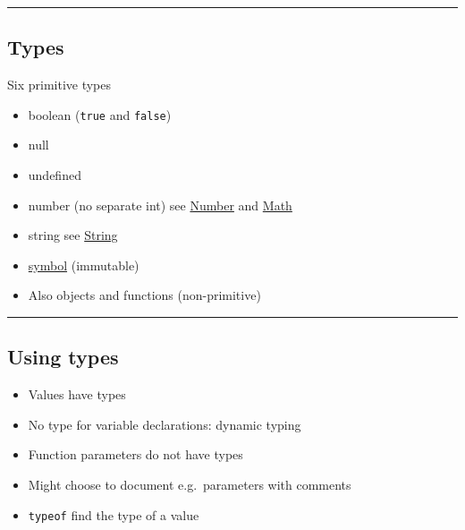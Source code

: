 \documentclass{article}[18pt]
\providecommand{\tightlist}{%
  \setlength{\itemsep}{0pt}\setlength{\parskip}{0pt}}
\begin{document}
\begin{center}\rule{0.5\linewidth}{\linethickness}\end{center}

\hypertarget{types}{%
\subsection{Types}\label{types}}

Six primitive types

\begin{itemize}
\tightlist
\item
  boolean (\texttt{true} and \texttt{false})
\item
  null
\item
  undefined
\item
  number (no separate int) see
  \href{https://developer.mozilla.org/en-US/docs/Web/JavaScript/Reference/Global_Objects/Number}{Number}
  and
  \href{https://developer.mozilla.org/en-US/docs/Web/JavaScript/Reference/Global_Objects/Math}{Math}
\item
  string see
  \href{https://developer.mozilla.org/en-US/docs/Web/JavaScript/Reference/Global_Objects/String}{String}
\item
  \href{https://developer.mozilla.org/en-US/docs/Glossary/Symbol}{symbol}
  (immutable)
\item
  Also objects and functions (non-primitive)
\end{itemize}

\begin{center}\rule{0.5\linewidth}{\linethickness}\end{center}

\hypertarget{using-types}{%
\subsection{Using types}\label{using-types}}

\begin{itemize}
\tightlist
\item
  Values have types
\item
  No type for variable declarations: dynamic typing
\item
  Function parameters do not have types
\item
  Might choose to document e.g.~parameters with comments
\item
  \texttt{typeof} find the type of a value
\end{itemize}
\end{document}
